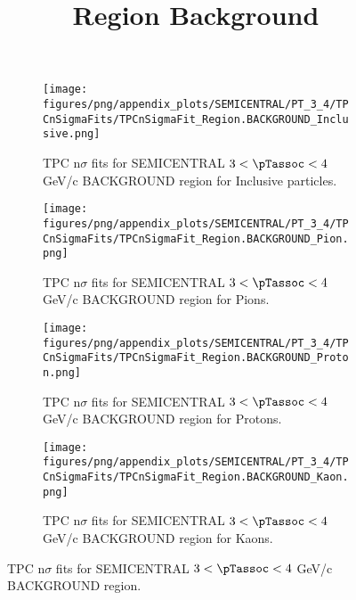             \begin{figure}[H]
                \title{Region Background}
                \begin{subfigure}[b]{0.5\textwidth}
                    \centering
                    \texttt{[image: figures/png/appendix\_plots/SEMICENTRAL/PT\_3\_4/TPCnSigmaFits/TPCnSigmaFit\_Region.BACKGROUND\_Inclusive.png]}
                    \caption{TPC n$\sigma$ fits for SEMICENTRAL $3 < \pTassoc < 4$ GeV/c BACKGROUND region for Inclusive particles.}
                    \label{fig:appendix_SEMICENTRAL_$3 < \pTassoc < 4$ GeV/c_BACKGROUND_Inclusive}
                \end{subfigure}
                \begin{subfigure}[b]{0.5\textwidth}
                    \centering
                    \texttt{[image: figures/png/appendix\_plots/SEMICENTRAL/PT\_3\_4/TPCnSigmaFits/TPCnSigmaFit\_Region.BACKGROUND\_Pion.png]}
                    \caption{TPC n$\sigma$ fits for SEMICENTRAL $3 < \pTassoc < 4$ GeV/c BACKGROUND region for Pions.}
                    \label{fig:appendix_SEMICENTRAL_$3 < \pTassoc < 4$ GeV/c_BACKGROUND_Pion}
                \end{subfigure}
                \begin{subfigure}[b]{0.5\textwidth}
                    \centering
                    \texttt{[image: figures/png/appendix\_plots/SEMICENTRAL/PT\_3\_4/TPCnSigmaFits/TPCnSigmaFit\_Region.BACKGROUND\_Proton.png]}
                    \caption{TPC n$\sigma$ fits for SEMICENTRAL $3 < \pTassoc < 4$ GeV/c BACKGROUND region for Protons.}
                    \label{fig:appendix_SEMICENTRAL_$3 < \pTassoc < 4$ GeV/c_BACKGROUND_Proton}
                \end{subfigure}
                \begin{subfigure}[b]{0.5\textwidth}
                    \centering
                    \texttt{[image: figures/png/appendix\_plots/SEMICENTRAL/PT\_3\_4/TPCnSigmaFits/TPCnSigmaFit\_Region.BACKGROUND\_Kaon.png]}
                    \caption{TPC n$\sigma$ fits for SEMICENTRAL $3 < \pTassoc < 4$ GeV/c BACKGROUND region for Kaons.}
                    \label{fig:appendix_SEMICENTRAL_$3 < \pTassoc < 4$ GeV/c_BACKGROUND_Kaon}
                \end{subfigure}
                \caption{TPC n$\sigma$ fits for SEMICENTRAL $3 < \pTassoc < 4$ GeV/c BACKGROUND region.}
                \label{fig:appendix_SEMICENTRAL_$3 < \pTassoc < 4$ GeV/c_BACKGROUND}
            \end{figure}
            \clearpage
            
